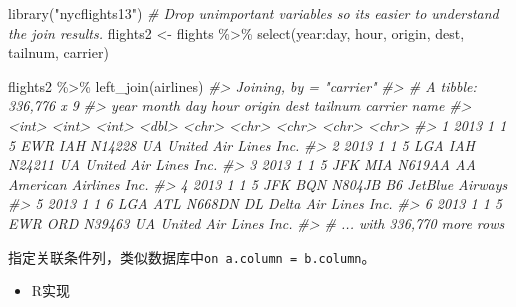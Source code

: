 \documentclass[
]{book}
\newenvironment{Shaded}{\begin{snugshade}}{\end{snugshade}}
\newcommand{\CommentTok}[1]{\textcolor[rgb]{0.56,0.35,0.01}{\textit{#1}}}
\newcommand{\FunctionTok}[1]{\textcolor[rgb]{0.00,0.00,0.00}{#1}}
\newcommand{\NormalTok}[1]{#1}
\newcommand{\OtherTok}[1]{\textcolor[rgb]{0.56,0.35,0.01}{#1}}
\newcommand{\SpecialCharTok}[1]{\textcolor[rgb]{0.00,0.00,0.00}{#1}}
\newcommand{\StringTok}[1]{\textcolor[rgb]{0.31,0.60,0.02}{#1}}
\providecommand{\tightlist}{%
  \setlength{\itemsep}{0pt}\setlength{\parskip}{0pt}}
\begin{document}
\begin{Shaded}
\begin{Highlighting}[]
\FunctionTok{library}\NormalTok{(}\StringTok{"nycflights13"}\NormalTok{)}
\CommentTok{\# Drop unimportant variables so it\textquotesingle{}s easier to understand the join results.}
\NormalTok{flights2 }\OtherTok{\textless{}{-}}\NormalTok{ flights }\SpecialCharTok{\%\textgreater{}\%} \FunctionTok{select}\NormalTok{(year}\SpecialCharTok{:}\NormalTok{day, hour, origin, dest, tailnum, carrier)}

\NormalTok{flights2 }\SpecialCharTok{\%\textgreater{}\%} 
  \FunctionTok{left\_join}\NormalTok{(airlines)}
\CommentTok{\#\textgreater{} Joining, by = "carrier"}
\CommentTok{\#\textgreater{} \# A tibble: 336,776 x 9}
\CommentTok{\#\textgreater{}    year month   day  hour origin dest  tailnum carrier name                  }
\CommentTok{\#\textgreater{}   \textless{}int\textgreater{} \textless{}int\textgreater{} \textless{}int\textgreater{} \textless{}dbl\textgreater{} \textless{}chr\textgreater{}  \textless{}chr\textgreater{} \textless{}chr\textgreater{}   \textless{}chr\textgreater{}   \textless{}chr\textgreater{}                 }
\CommentTok{\#\textgreater{} 1  2013     1     1     5 EWR    IAH   N14228  UA      United Air Lines Inc. }
\CommentTok{\#\textgreater{} 2  2013     1     1     5 LGA    IAH   N24211  UA      United Air Lines Inc. }
\CommentTok{\#\textgreater{} 3  2013     1     1     5 JFK    MIA   N619AA  AA      American Airlines Inc.}
\CommentTok{\#\textgreater{} 4  2013     1     1     5 JFK    BQN   N804JB  B6      JetBlue Airways       }
\CommentTok{\#\textgreater{} 5  2013     1     1     6 LGA    ATL   N668DN  DL      Delta Air Lines Inc.  }
\CommentTok{\#\textgreater{} 6  2013     1     1     5 EWR    ORD   N39463  UA      United Air Lines Inc. }
\CommentTok{\#\textgreater{} \# ... with 336,770 more rows}
\end{Highlighting}
\end{Shaded}

指定关联条件列，类似数据库中\texttt{on\ a.column\ =\ b.column}。

\begin{itemize}
\tightlist
\item
  R实现
\end{itemize}
\end{document}
